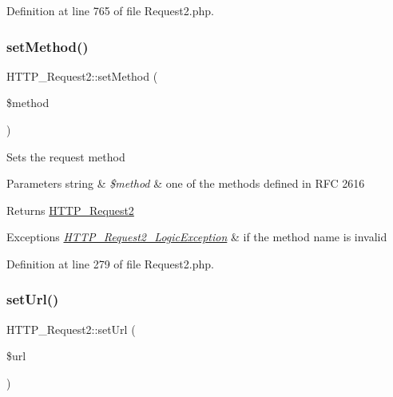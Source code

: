 Definition at line 765 of file Request2.\+php.

\mbox{\label{classHTTP__Request2_a3372c369ddc092061cc15ff2f80a859f}} 
\subsubsection{\texorpdfstring{set\+Method()}{setMethod()}}
{\footnotesize\ttfamily H\+T\+T\+P\+\_\+\+Request2\+::set\+Method (\begin{DoxyParamCaption}\item[{}]{\$method }\end{DoxyParamCaption})}

Sets the request method


\begin{DoxyParams}[1]{Parameters}
string & {\em \$method} & one of the methods defined in R\+FC 2616\\
\hline
\end{DoxyParams}
\begin{DoxyReturn}{Returns}
\hyperlink{classHTTP__Request2}{H\+T\+T\+P\+\_\+\+Request2} 
\end{DoxyReturn}

\begin{DoxyExceptions}{Exceptions}
{\em \hyperlink{classHTTP__Request2__LogicException}{H\+T\+T\+P\+\_\+\+Request2\+\_\+\+Logic\+Exception}} & if the method name is invalid \\
\hline
\end{DoxyExceptions}


Definition at line 279 of file Request2.\+php.

\mbox{\label{classHTTP__Request2_a323cb019d1cb621ec9419941d42130d1}} 
\subsubsection{\texorpdfstring{set\+Url()}{setUrl()}}
{\footnotesize\ttfamily H\+T\+T\+P\+\_\+\+Request2\+::set\+Url (\begin{DoxyParamCaption}\item[{}]{\$url }\end{DoxyParamCaption})}

